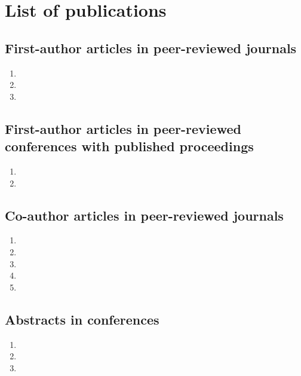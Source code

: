 \chapter{List of publications}

\doublespacing

\section*{First-author articles in peer-reviewed journals} %
\label{sec:first_author_journal_articles}
\begin{enumerate}
  \item {}
  \item {}
  \item {}
\end{enumerate}

\section*{First-author articles in peer-reviewed conferences with published proceedings}
\label{sec:first_author_peer_reviewed_conference_papers}
\begin{enumerate}
  \item {}
  \item {}
\end{enumerate}

\section*{Co-author articles in peer-reviewed journals} %
\label{sec:journal_articles}
\begin{enumerate}
  \item {}
  \item {}
  \item {}
  \item {}
  \item {}
\end{enumerate}

\section*{Abstracts in conferences} %
\label{sec:abstracts}
\begin{enumerate}
  \item {}
  \item {}
  \item {}
\end{enumerate}

\onehalfspacing

